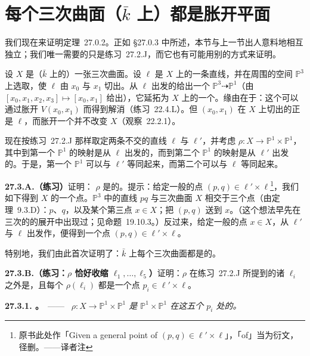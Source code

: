 
\section{每个\trSmooth{}三次曲面（$\bar{k}$ 上）都是胀开平面}

我们现在来证明\mbox{定理~27.0.2}。正如 \S27.0.3 中所述，本节与上一节出人意料地相互独立；我们唯一需要的只是\mbox{练习~27.2.J}，而它也有可能用别的方式来证明。

设 $X$ 是（$\bar{k}$ 上的）一张\trSmooth{}三次曲面。设 $\ell$ 是 $X$ 上的一条直线，并在周围的空间 $\mathbb{P}^3$ 上选取\trCoordinate{}，使 $\ell$ 由 $x_0$ 与 $x_1$ 切出。从 $\ell$ 出发的\trProjection{}给出一个\trRationalMap{} $\mathbb{P}^3\dashrightarrow\mathbb{P}^1$（由 $[x_0,x_1,x_2,x_3]\mapsto[x_0,x_1]$ 给出），它延拓为 $X$ 上的一个\trMorphism{}。缘由在于：这个\trRationalMap{}可以通过胀开\trClosedSubscheme{} $V(x_0,x_1)$ 而得到解消（\mbox{练习~22.4.L}）。但 $(x_0,x_1)$ 在 $X$ 上切出的正是\trEffectiveCartierDivisor{} $\ell$，而胀开一个\trEffectiveCartierDivisor{}并不改变 $X$（\mbox{观察~22.2.1}）。

现在按\mbox{练习~27.2.J} 那样取定两条不交的直线 $\ell$ 与 $\ell'$，并考虑\trMorphism{} $\rho\colon X\to\mathbb{P}^1\times\mathbb{P}^1$，其中到第一个 $\mathbb{P}^1$ 的映射是从 $\ell$ 出发的\trProjection{}，而到第二个 $\mathbb{P}^1$ 的映射是从 $\ell'$ 出发的\trProjection{}。于是，第一个 $\mathbb{P}^1$ 可以与 $\ell'$ 等同起来，而第二个可以与 $\ell$ 等同起来。

\textbf{27.3.A.（练习）}\quad 证明：\trMorphism{} $\rho$ 是\trBirational{}的。提示：给定一般的点 $(p,q)\in\ell'\times\ell$\footnote{原书此处作「Given a general point of $(p,q)\in\ell'\times\ell$」，「of」当为衍文，径删。——译者注}，我们如下得到 $X$ 的一个点。$\mathbb{P}^3$ 中的直线 $pq$ 与三次曲面 $X$ 相交于三个点（由\mbox{\trBezout{}定理~9.3.D}）：$p$、$q$，以及某个第三点 $x\in X$；把 $(p,q)$ 送到 $x$。（这个想法早先在三次\trCurve{}的\trGroupLaw{}的展开中出现过；见\mbox{命题~19.10.3}。）反过来，给定一般的点 $x\in X$，从 $\ell'$ 与 $\ell$ 出发作\trProjection{}，便得到一个点 $(p,q)\in\ell'\times\ell$。

特别地，我们由此首次证明了：$\bar{k}$ 上每个\trSmooth{}三次曲面都是\trRational{}的。

\textbf{27.3.B.（练习：$\rho$ 恰好收缩 $\ell_1,\dots,\ell_5$）}\quad 证明：$\rho$ 在\mbox{练习~27.2.J} 所提到的诸 $\ell_i$ 之外是\trIsomorphism{}，且每个 $\rho(\ell_i)$ 都是一个点 $p_i\in\ell'\times\ell$。

\textbf{27.3.1. \trhProposition{}。}\ ——\ \emph{\trMorphism{} $\rho\colon X\to\mathbb{P}^1\times\mathbb{P}^1$ 是 $\mathbb{P}^1\times\mathbb{P}^1$ 在这五个 $p_i$ 处的\trBlowup{}。}

